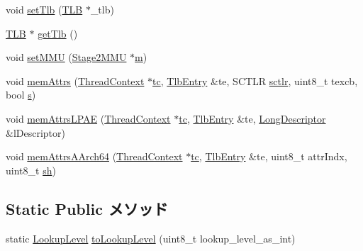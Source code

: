 \begin{DoxyCompactItemize}
\item 
void \hyperlink{classArmISA_1_1TableWalker_a0a70f006e7adf20d47920ac6286a2bcb}{setTlb} (\hyperlink{classArmISA_1_1TLB}{TLB} $\ast$\_\-tlb)
\item 
\hyperlink{classArmISA_1_1TLB}{TLB} $\ast$ \hyperlink{classArmISA_1_1TableWalker_a93d3a5cc8edcf04b6e62ce3ce3eb215c}{getTlb} ()
\item 
void \hyperlink{classArmISA_1_1TableWalker_ae888fc9d1a9bad8784469601dcf8d436}{setMMU} (\hyperlink{classArmISA_1_1Stage2MMU}{Stage2MMU} $\ast$\hyperlink{namespaceArmISA_afb747b54d0c5e3e4e1763be19ca9373b}{m})
\item 
void \hyperlink{classArmISA_1_1TableWalker_a43ff5c97155cc958074f6212824d8890}{memAttrs} (\hyperlink{classThreadContext}{ThreadContext} $\ast$\hyperlink{namespaceArmISA_a5aff829af55e65b802d83dfcef4e9dd0}{tc}, \hyperlink{structArmISA_1_1TlbEntry}{TlbEntry} \&te, SCTLR \hyperlink{classArmISA_1_1TableWalker_a43c4d132ca97c6cc5358f7be3c2b5a69}{sctlr}, uint8\_\-t texcb, bool \hyperlink{namespaceArmISA_afaeb18e17f862d8fcb76dfb68a18854f}{s})
\item 
void \hyperlink{classArmISA_1_1TableWalker_ae00bd2d40b63721817ec582dbf4022a5}{memAttrsLPAE} (\hyperlink{classThreadContext}{ThreadContext} $\ast$\hyperlink{namespaceArmISA_a5aff829af55e65b802d83dfcef4e9dd0}{tc}, \hyperlink{structArmISA_1_1TlbEntry}{TlbEntry} \&te, \hyperlink{classArmISA_1_1TableWalker_1_1LongDescriptor}{LongDescriptor} \&lDescriptor)
\item 
void \hyperlink{classArmISA_1_1TableWalker_ae90661ceebb345173d8a0e9306fa9a82}{memAttrsAArch64} (\hyperlink{classThreadContext}{ThreadContext} $\ast$\hyperlink{namespaceArmISA_a5aff829af55e65b802d83dfcef4e9dd0}{tc}, \hyperlink{structArmISA_1_1TlbEntry}{TlbEntry} \&te, uint8\_\-t attrIndx, uint8\_\-t \hyperlink{namespaceArmISA_ae375ae4bca8c4da631387855d380343d}{sh})
\end{DoxyCompactItemize}
\subsection*{Static Public メソッド}
\begin{DoxyCompactItemize}
\item 
static \hyperlink{namespaceArmISA_aefa4213b348e38ee69f2a6109563a7bd}{LookupLevel} \hyperlink{classArmISA_1_1TableWalker_aea45aff83099165fcb29b3c3df3de9c2}{toLookupLevel} (uint8\_\-t lookup\_\-level\_\-as\_\-int)
\end{DoxyCompactItemize}
